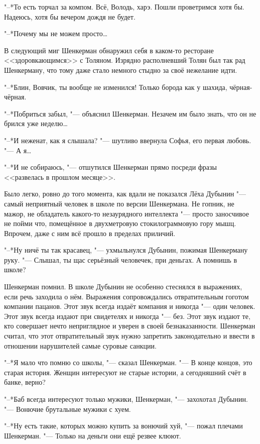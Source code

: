 "--*То есть торчал за компом.
Всё, Володь, харэ.
Пошли проветримся хотя бы.
Надеюсь, хотя бы вечером дождя не будет.

"--*Почему мы не можем просто\ldots{}

В следующий миг Шенкерман обнаружил себя в каком-то ресторане <<здоровкающимся>> с Толяном.
Изрядно располневший Толян был так рад Шенкерману, что тому даже стало немного стыдно за своё нежелание идти.

"--*Блин, Вовчик, ты вообще не изменился!
Только борода как у шахида, чёрная-чёрная.

"--*Побриться забыл, "--- объяснил Шенкерман.
Незачем им было знать, что он не брился уже неделю\ldots{}

"--*И неженат, как я слышала? "--- шутливо ввернула Софья, его первая любовь.
"--- А я\ldots{}

"--*И не собираюсь, "--- отшутился Шенкерман прямо посреди фразы <<развелась в прошлом месяце>>.

Было легко, ровно до того момента, как вдали не показался Лёха Дубынин "--- самый неприятный человек в школе по версии Шенкермана.
Не гопник, не мажор, не обладатель какого-то незаурядного интеллекта "--- просто заносчивое не пойми что, помещённое в двухметровую стокилограммовую гору мышц.
Впрочем, даже с ним всё прошло в пределах приличий.

"--*Ну ничё ты так красавец, "--- ухмыльнулся Дубынин, пожимая Шенкерману руку.
"--- Слышал, ты щас серьёзный человечек, при деньгах.
А помнишь в школе?

Шенкерман помнил.
В школе Дубынин не особенно стеснялся в выражениях, если речь заходила о нём.
Выражения сопровождались отвратительным гоготом компании пацанов.
Этот звук всегда издаёт компания и никогда "--- один человек.
Этот звук всегда издают при свидетелях и никогда "--- без.
Этот звук издают те, кто совершает нечто неприглядное и уверен в своей безнаказанности.
Шенкерман считал, что этот отвратительный звук нужно запретить законодательно и ввести в отношении нарушителей самые суровые санкции.

"--*Я мало что помню со школы, "--- сказал Шенкерман.
"--- В конце концов, это старая история.
Женщин интересуют не старые истории, а сегодняшний счёт в банке, верно?

"--*Баб всегда интересуют только мужики, Шенкерман, "--- захохотал Дубынин.
"--- Вонючие брутальные мужики с хуем.

"--*Ну есть такие, которых можно купить за вонючий хуй, "--- пожал плечами Шенкерман.
"--- Только на деньги они ещё резвее клюют.

